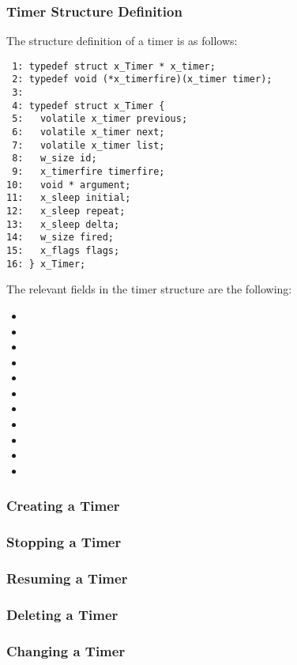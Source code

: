 \subsubsection{Timer Structure Definition}

The structure definition of a timer is as follows:

\bcode
\begin{verbatim}
 1: typedef struct x_Timer * x_timer;
 2: typedef void (*x_timerfire)(x_timer timer);
 3:
 4: typedef struct x_Timer {
 5:   volatile x_timer previous;
 6:   volatile x_timer next;
 7:   volatile x_timer list;
 8:   w_size id;
 9:   x_timerfire timerfire;
10:   void * argument;
11:   x_sleep initial;
12:   x_sleep repeat;
13:   x_sleep delta;
14:   w_size fired;
15:   x_flags flags;
16: } x_Timer;
\end{verbatim}
\ecode

The relevant fields in the timer structure are the following:

\begin{itemize}
\item {}
\item {}
\item {}
\item {}
\item {}
\item {}
\item {}
\item {}
\item {}
\item {}
\item {}
\end{itemize}

\subsubsection{Creating a Timer}

\subsubsection{Stopping a Timer}

\subsubsection{Resuming a Timer}

\subsubsection{Deleting a Timer}

\subsubsection{Changing a Timer}


